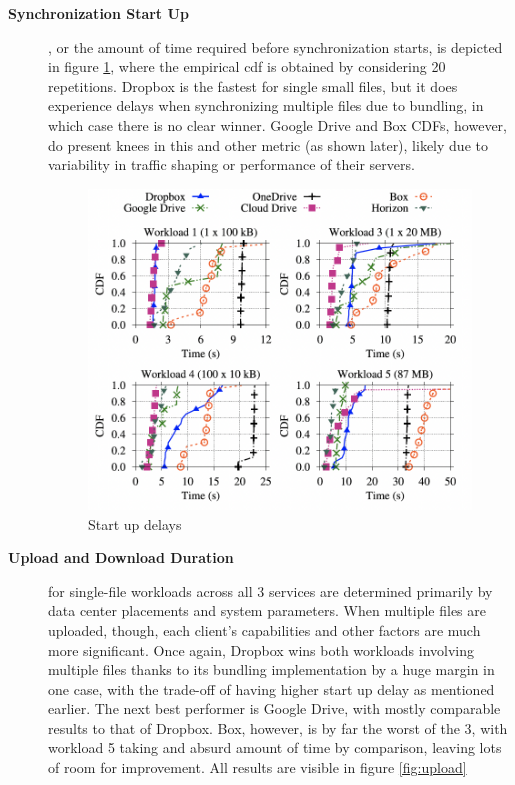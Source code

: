 \begin{description}
	\item[\textbf{Synchronization Start Up}], or the amount of time required before synchronization starts, is depicted in figure \ref{fig:synchronization start up}, where the empirical \ac{cdf} is obtained by considering 20 repetitions. Dropbox is the fastest for single small files, but it does experience delays when synchronizing multiple files due to bundling, in which case there is no clear winner. Google Drive and Box CDFs, however, do present knees in this and other metric (as shown later), likely due to variability in traffic shaping or performance of their servers.
	
    \begin{figure} [h]
		\centering
		\includegraphics[scale=0.7]{images/start_up_delay}
		\caption{\label{fig:synchronization start up}Start up delays}
	\end{figure}
	
	\item[\textbf{Upload and Download Duration}] for single-file workloads across all 3 services are determined primarily by data center placements and system parameters. When multiple files are uploaded, though, each client's capabilities and other factors are much more significant. Once again, Dropbox wins both workloads involving multiple files thanks to its bundling implementation by a huge margin in one case, with the trade-off of having higher start up delay as mentioned earlier. The next best performer is Google Drive, with mostly comparable results to that of Dropbox. Box, however, is by far the worst of the 3, with workload 5 taking and absurd amount of time by comparison, leaving lots of room for improvement. All results are visible in figure  \ref{fig:upload}
	

\end{description}
